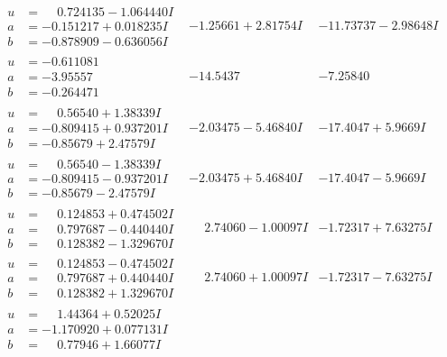 \documentclass[1p]{elsarticle_modified}
\theoremstyle{definition}
\begin{document}
$$\begin{array}{c|c|c}
\begin{aligned}
u &= \phantom{-}0.724135 - 1.064440 I \\
a &= -0.151217 + 0.018235 I \\
b &= -0.878909 - 0.636056 I\end{aligned}
 & -1.25661 + 2.81754 I & -11.73737 - 2.98648 I \\ \hline\begin{aligned}
u &= -0.611081\phantom{ +0.000000I} \\
a &= -3.95557\phantom{ +0.000000I} \\
b &= -0.264471\phantom{ +0.000000I}\end{aligned}
 & -14.5437\phantom{ +0.000000I} & -7.25840\phantom{ +0.000000I} \\ \hline\begin{aligned}
u &= \phantom{-}0.56540 + 1.38339 I \\
a &= -0.809415 + 0.937201 I \\
b &= -0.85679 + 2.47579 I\end{aligned}
 & -2.03475 - 5.46840 I & -17.4047 + 5.9669 I \\ \hline\begin{aligned}
u &= \phantom{-}0.56540 - 1.38339 I \\
a &= -0.809415 - 0.937201 I \\
b &= -0.85679 - 2.47579 I\end{aligned}
 & -2.03475 + 5.46840 I & -17.4047 - 5.9669 I \\ \hline\begin{aligned}
u &= \phantom{-}0.124853 + 0.474502 I \\
a &= \phantom{-}0.797687 - 0.440440 I \\
b &= \phantom{-}0.128382 - 1.329670 I\end{aligned}
 & \phantom{-}2.74060 - 1.00097 I & -1.72317 + 7.63275 I \\ \hline\begin{aligned}
u &= \phantom{-}0.124853 - 0.474502 I \\
a &= \phantom{-}0.797687 + 0.440440 I \\
b &= \phantom{-}0.128382 + 1.329670 I\end{aligned}
 & \phantom{-}2.74060 + 1.00097 I & -1.72317 - 7.63275 I \\ \hline\begin{aligned}
u &= \phantom{-}1.44364 + 0.52025 I \\
a &= -1.170920 + 0.077131 I \\
b &= \phantom{-}0.77946 + 1.66077 I\end{aligned}

\end{array}$$
\end{document}
